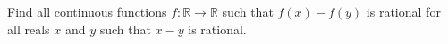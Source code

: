 \documentclass{article}
\begin{document}
\setlength{\parindent}{0pt}
Find all continuous functions $f:\mathbb{R}\to\mathbb{R}$ such that $f(x)-f(y)$ is rational for all reals $x$ and $y$ such that $x-y$ is rational.
\end{document}
